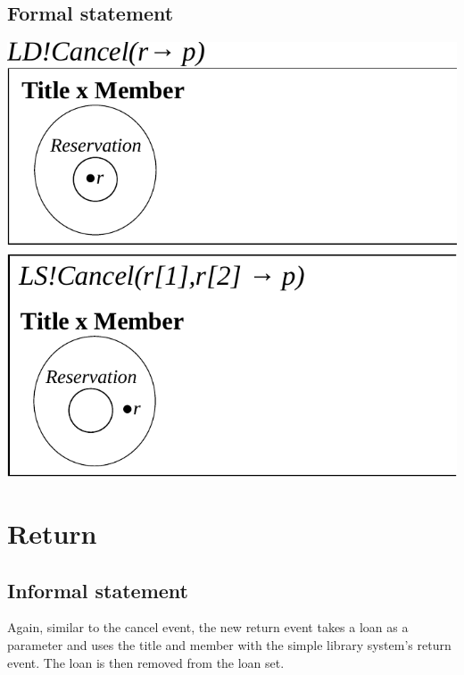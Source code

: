 \documentclass[]{report}
\begin{document}
\subsection{Formal statement}
\begin{center}
	\includegraphics{cancel.pdf}
\end{center}
\newpage
\section{Return}
\subsection{Informal statement}
Again, similar to the cancel event, the new return event takes a loan as a parameter and uses the title and member with the simple library system's return event. The loan is then removed from the loan set.
\end{document}
